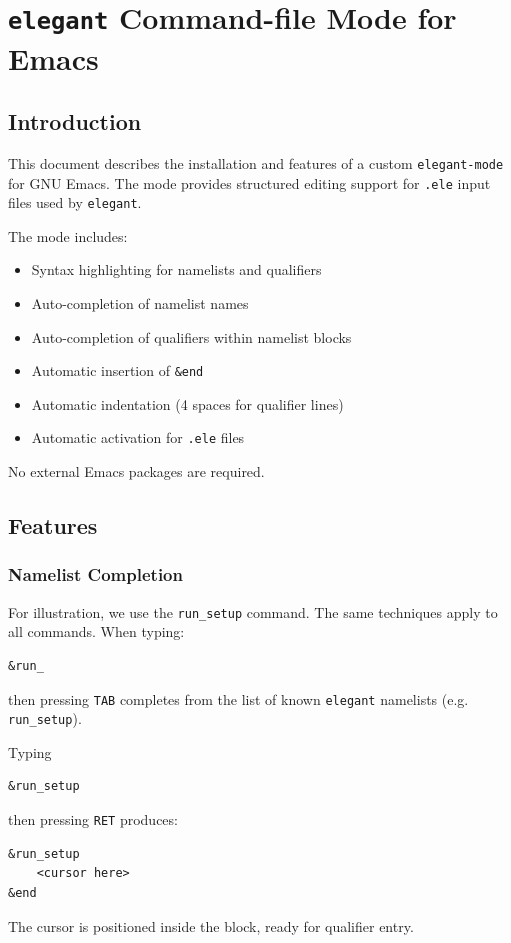 
\lstset{
  basicstyle=\ttfamily\small,
  breaklines=true,
  columns=fullflexible
}

\section{{\tt elegant} Command-file Mode for Emacs}

\subsection{Introduction}

This document describes the installation and features of a custom
\texttt{elegant-mode} for GNU Emacs.
The mode provides structured editing support for
\texttt{.ele} input files used by {\tt elegant}.

The mode includes:
\begin{itemize}[noitemsep]
\item Syntax highlighting for namelists and qualifiers
\item Auto-completion of namelist names
\item Auto-completion of qualifiers within namelist blocks
\item Automatic insertion of \texttt{\&end}
\item Automatic indentation (4 spaces for qualifier lines)
\item Automatic activation for \texttt{.ele} files
\end{itemize}

No external Emacs packages are required.

\subsection{Features}

\subsubsection{Namelist Completion}

For illustration, we use the \verb|run_setup| command. The same techniques apply to all
commands.
When typing:
\begin{lstlisting}
&run_
\end{lstlisting}
then pressing \texttt{TAB} completes from the list of known {\tt elegant}
namelists (e.g. \texttt{run_setup}).

Typing
\begin{lstlisting}
&run_setup
\end{lstlisting}
then pressing \texttt{RET} produces:
\begin{lstlisting}
&run_setup
    <cursor here>
&end
\end{lstlisting}
The cursor is positioned inside the block, ready for qualifier entry.

